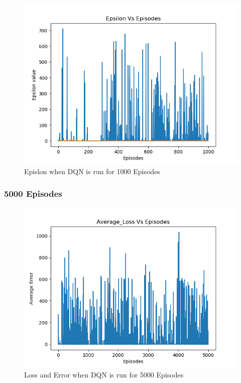 \documentclass[doc, onecolumn, 12pt]{apa6}
\begin{document}
\begin{figure}
\label{DQN_1000Ep_Epsilon}
\includegraphics[width =\textwidth, height=0.4 \textheight]{results/dqn/1000_ep/Epsilon.png}
\caption{Epislon when DQN is run for 1000 Episodes}
\end{figure}

\FloatBarrier 
\subsubsection{5000 Episodes}
\begin{figure}
\label{DQN_5000Ep_Error}
\includegraphics[width =\textwidth, height=0.4 \textheight]{results/dqn/5000_ep/Error.png}
\caption{Loss and Error when DQN is run for 5000 Episodes}
\end{figure}
\end{document}
